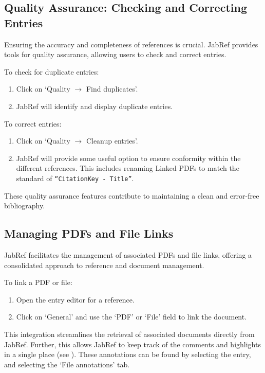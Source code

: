 		\subsection{Quality Assurance: Checking and Correcting Entries}
			Ensuring the accuracy and completeness of references is crucial. 
			JabRef provides tools for quality assurance, allowing users to check and correct entries.

			To check for duplicate entries:
			\begin{enumerate}
				\item Click on `Quality $\rightarrow$ Find duplicates'.
				\item JabRef will identify and display duplicate entries.
			\end{enumerate}
			
			To correct entries:
			\begin{enumerate}
				\item Click on `Quality $\rightarrow$ Cleanup entries'.
				\item JabRef will provide some useful option to ensure conformity within the different references.
					This includes renaming Linked PDFs to match the standard of \texttt{``CitationKey - Title''}.
			\end{enumerate}
						
			These quality assurance features contribute to maintaining a clean and error-free bibliography.

		\subsection{Managing PDFs and File Links}
			JabRef facilitates the management of associated PDFs and file links, offering a consolidated approach to reference and document management.

			To link a PDF or file:
			\begin{enumerate}
				\item Open the entry editor for a reference.
				\item Click on `General' and use the `PDF' or `File' field to link the document.
			\end{enumerate}
			This integration streamlines the retrieval of associated documents directly from JabRef.
			Further, this allows JabRef to keep track of the comments and highlights in a single place (see ).
			These annotations can be found by selecting the entry, and selecting the `File annotations' tab.

